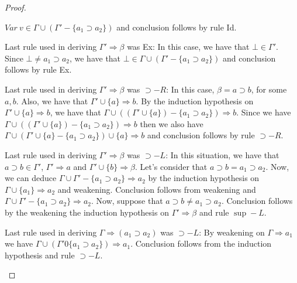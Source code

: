 \documentclass[12pt]{article}
\theoremstyle{definition}
\begin{document}
\begin{proof}
\begin{Cases}
\begin{Cases}
\begin{Cases}
               $Var\:v\in\Gamma \cup (\Gamma' - \{a_1 \supset a_2\})$ and
               conclusion follows by rule Id.
             \item Last rule used in deriving $\Gamma' \Rightarrow \beta$ was
               Ex: In this case, we have that $\bot \in \Gamma'$. Since
               $\bot \neq a_1 \supset a_2$, we have that
               $\bot\in\Gamma \cup (\Gamma' - \{a_1 \supset a_2\})$ and
               conclusion follows by rule Ex.
             \item Last rule used in deriving $\Gamma' \Rightarrow \beta$ was
               $\supset-R$: In this case, $\beta = a \supset b$, for some $a,b$.
               Also, we have that $\Gamma' \cup \{a\}\Rightarrow b$. By the
               induction hypothesis on $\Gamma' \cup \{a\}\Rightarrow b$, we
               have that
               $\Gamma \cup ((\Gamma' \cup \{a\}) - \{a_1 \supset
               a_2\})\Rightarrow b$. Since we have 
               $\Gamma \cup ((\Gamma' \cup \{a\}) - \{a_1 \supset
               a_2\})\Rightarrow b$ then we also have
               $\Gamma \cup (\Gamma' \cup \{a\} - \{a_1 \supset
               a_2\}) \cup \{a\} \Rightarrow b$ and conclusion follows by rule
               $\supset-R$.
             \item Last rule used in deriving $\Gamma' \Rightarrow \beta$ was
               $\supset-L$: In this situation, we have that
               $a \supset b \in \Gamma'$, $\Gamma' \Rightarrow a$ and
               $\Gamma' \cup \{b\} \Rightarrow \beta$. Let's consider that
               $a \supset b = a_1 \supset a_2$. Now, we can deduce
               $\Gamma \cup \Gamma' - \{a_1 \supset a_2\} \Rightarrow a_2$ by
               the induction hypothesis on $\Gamma \cup \{a_1\} \Rightarrow a_2$
               and weakening. Conclusion follows from weakening and
               $\Gamma \cup \Gamma' - \{a_1 \supset a_2\} \Rightarrow a_2$.
               Now, suppose that $a \supset b \neq a_1 \supset a_2$. Conclusion
               follows by the weakening the induction hypothesis on
               $\Gamma' \Rightarrow \beta$ and rule $\sup-L$.
             \end{Cases}
            \item Last rule used in deriving $\Gamma \Rightarrow (a_1 \supset a_2)$ was
              $\supset-L$: By weakening on $\Gamma \Rightarrow a_1$ we have
              $\Gamma \cup (\Gamma' 0 \{a_1 \supset a_2\}) \Rightarrow a_1$.
              Conclusion follows from the induction hypothesis and rule $\supset-L$.
          \end{Cases} 
  \end{Cases}
\end{proof}
\end{document}
